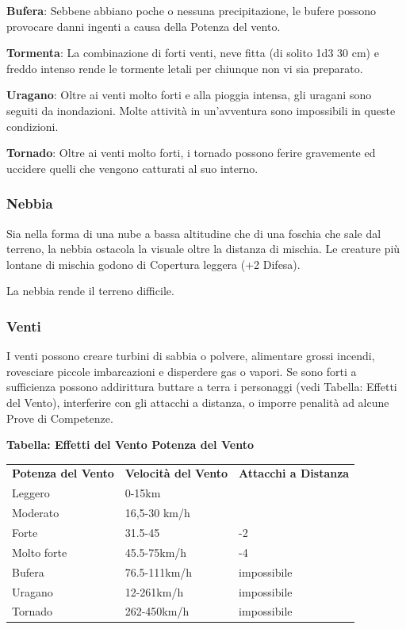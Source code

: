 \documentclass[a4paper,11pt,twoside,openany]{book}
\begin{document}
{\textbf{Bufera}: Sebbene abbiano poche o nessuna precipitazione, le bufere possono provocare danni ingenti a causa della Potenza del vento.

\textbf{Tormenta}: La combinazione di forti venti, neve fitta (di solito 1d3 \texttimes{} 30 cm) e freddo intenso rende le tormente letali per chiunque non vi sia preparato. 

\textbf{Uragano}: Oltre ai venti molto forti e alla pioggia intensa, gli uragani sono seguiti da inondazioni. Molte attività in un'avventura sono impossibili in queste condizioni.

\textbf{Tornado}: Oltre ai venti molto forti, i tornado possono ferire gravemente ed uccidere quelli che vengono catturati al suo interno.

\subsubsection{Nebbia}

\label{nebbia}

Sia nella forma di una nube a bassa altitudine che di una foschia che sale dal terreno, la nebbia ostacola la visuale oltre la distanza di mischia. Le creature più lontane di mischia godono di Copertura leggera (+2 Difesa).

La nebbia rende il terreno difficile.


\subsubsection{Venti}

\label{venti}

I venti possono creare turbini di sabbia o polvere, alimentare grossi incendi, rovesciare piccole imbarcazioni e disperdere gas o vapori. Se sono forti a sufficienza possono addirittura buttare a terra i personaggi (vedi Tabella: Effetti del Vento), interferire con gli attacchi a distanza, o imporre penalità ad alcune Prove di Competenze.

\textbf{Tabella: Effetti del Vento Potenza del Vento}

\medskip

\begin{tabular}{lll}
\toprule
\textbf{Potenza del Vento} & \textbf{Velocità del Vento} & \textbf{Attacchi a Distanza}\\
Leggero & 0-15km \tabularnewline
Moderato & 16,5-30 km/h  \tabularnewline
Forte & 31.5-45 & -2 \tabularnewline
Molto forte & 45.5-75km/h & -4 \tabularnewline
Bufera & 76.5-111km/h & impossibile  \tabularnewline
Uragano & 12-261km/h & impossibile \tabularnewline
Tornado & 262-450km/h & impossibile\tabularnewline
\end{tabular}

}
\end{document}
